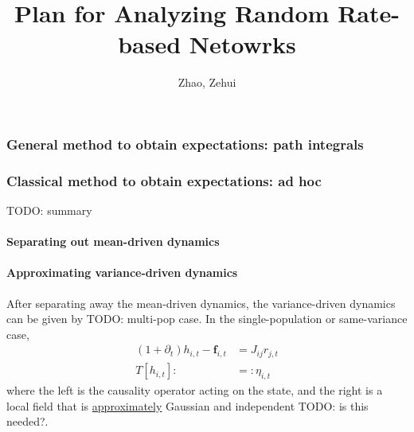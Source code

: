 \documentclass[11pt,openany,oneside]{article} %
\title{\vspace{-2em}Plan for Analyzing Random Rate-based Netowrks}
\author{Zhao, Zehui}
\date{}
\newcommand{\del}{\partial} \newcommand{\Del}{\nabla}
\newcommand{\phd}[1]{\left\lbrack {#1}\right\rbrack}\newcommand{\mphd}[1]{\lbrack {#1}\rbrack}\newcommand{\lphd}[1]{\left\lbrack {#1}\right.}\newcommand{\rphd}[1]{\left. {#1}\right\rbrack}%
\newcommand{\bd}[1]{\boldsymbol{#1}}%
\newcommand{\todo}[1]{{\color{red} TODO: #1}}
\begin{document}
\maketitle


\subsubsection{General method to obtain expectations: path integrals}

\subsubsection{Classical method to obtain expectations: ad hoc}
\todo{summary}

\paragraph{Separating out mean-driven dynamics}

\paragraph{Approximating variance-driven dynamics}
After separating away the mean-driven dynamics, the variance-driven dynamics can be given by
\todo{multi-pop case}.  In the single-population or same-variance case, 
\begin{equation}
  \label{eq:var-dyn}
  \begin{aligned}
      (1+\del_t)h_{i,t} - \bd{f}_{i,t} &= J_{ij}r_{j,t}\\
      T\phd{h_{i,t}} :&= : \eta_{i,t}
  \end{aligned}
\end{equation}
where the left is the causality operator acting on the state, and the right is a local field that is
\uline{approximately} Gaussian and independent \todo{is this needed?}.
\end{document}
